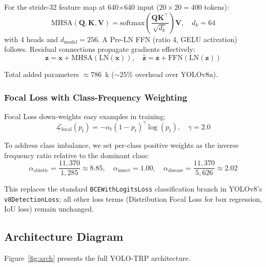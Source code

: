 \documentclass[12pt, a4paper]{article}
\begin{document}
For the stride-32 feature map at 640$\times$640 input ($20 \times 20 = 400$ tokens):
\[
  \text{MHSA}(\mathbf{Q,K,V}) = \text{softmax}\!\left(\frac{\mathbf{QK}^\top}{\sqrt{d_k}}\right)\mathbf{V}, \quad d_k = 64
\]
with 4 heads and $d_{\text{model}} = 256$. A Pre-LN FFN (ratio 4, GELU activation) follows. Residual connections propagate gradients effectively:
\[
  \mathbf{z} = \mathbf{x} + \text{MHSA}(\text{LN}(\mathbf{x})), \quad \hat{\mathbf{z}} = \mathbf{z} + \text{FFN}(\text{LN}(\mathbf{z}))
\]

Total added parameters $\approx 786$~k ($\sim\!25\%$ overhead over YOLOv8n).

\subsubsection{Focal Loss with Class-Frequency Weighting}
\label{sec:focal}

Focal Loss \cite{lin2017focal} down-weights easy examples in training:
\[
  \mathcal{L}_{\text{focal}}(p_t) = -\alpha_t (1 - p_t)^\gamma \log(p_t), \quad \gamma = 2.0
\]

To address class imbalance, we set per-class positive weights as the inverse frequency ratio relative to the dominant class:
\[
  \alpha_{\text{abiotic}} = \frac{11{,}370}{1{,}285} \approx 8.85, \quad
  \alpha_{\text{insect}}   = 1.00, \quad
  \alpha_{\text{disease}}  = \frac{11{,}370}{5{,}626} \approx 2.02
\]

This replaces the standard \texttt{BCEWithLogitsLoss} classification branch in YOLOv8's \texttt{v8DetectionLoss}; all other loss terms (Distribution Focal Loss for box regression, IoU loss) remain unchanged.

\subsection{Architecture Diagram}

Figure~\ref{fig:arch} presents the full YOLO-TRP architecture.
\end{document}
